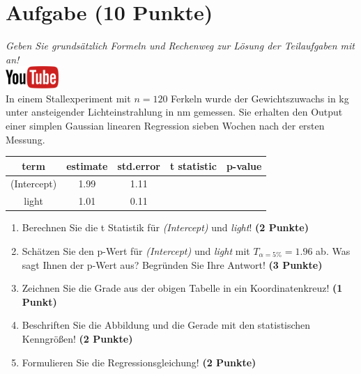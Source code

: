 \documentclass[a4paper, 9pt]{scrartcl}\usepackage[]{graphicx}\usepackage[]{xcolor}
\begin{document}
\section{Aufgabe \hfill (10 Punkte)}

\textit{Geben Sie grunds{\"a}tzlich Formeln und Rechenweg zur L{\"o}sung der
  Teilaufgaben mit an!} \\[1Ex]

\hfill\href{https://youtu.be/lJp8rFmMnrs}{\includegraphics[width =
  2cm]{img/youtube}}\\[1Ex]



In einem Stallexperiment mit $n = 120$ Ferkeln wurde der
Gewichtszuwachs in kg unter ansteigender Lichteinstrahlung in nm
gemessen. Sie erhalten den \Rlogo Output einer
simplen Gaussian linearen Regression sieben Wochen nach der ersten Messung.

\begin{table}[!h]
\centering\begingroup\fontsize{14}{16}\selectfont

\begin{tabular}{ccccc}
\toprule
term & estimate & std.error & t statistic & p-value\\
\midrule
(Intercept) & 1.99 & 1.11 &  & \\
light & 1.01 & 0.11 &  & \\
\bottomrule
\end{tabular}
\endgroup{}
\end{table}



\begin{enumerate}
\item Berechnen Sie die t Statistik f{\"u}r \textit{(Intercept)} und
  \textit{light}! \textbf{(2 Punkte)}
\item Sch{\"a}tzen Sie den p-Wert f{\"u}r \textit{(Intercept)} und
  \textit{light} mit $T_{\alpha = 5\%} = 1.96$ ab. Was sagt Ihnen der p-Wert aus?
  Begr{\"u}nden Sie Ihre Antwort! \textbf{(3 Punkte)}
\item Zeichnen Sie die Grade aus der obigen Tabelle in ein Koordinatenkreuz! \textbf{(1 Punkt)}
\item Beschriften Sie die Abbildung und die Gerade mit den statistischen
  Kenngr{\"o}{\ss}en! \textbf{(2 Punkte)}
\item Formulieren Sie die Regressionsgleichung! \textbf{(2 Punkte)}
\end{enumerate} 
\clearpage
\end{document}
